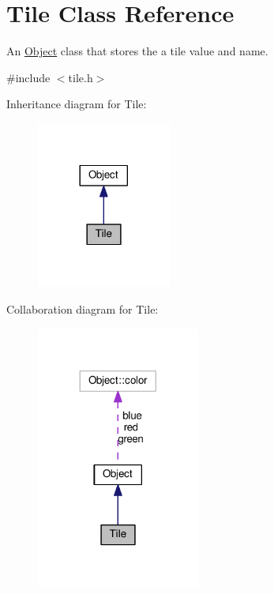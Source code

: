 \hypertarget{classTile}{}\section{Tile Class Reference}
\label{classTile}


An \hyperlink{classObject}{Object} class that stores the a tile value and name.  




{\ttfamily \#include $<$tile.\+h$>$}



Inheritance diagram for Tile\+:\nopagebreak
\begin{figure}[H]
\begin{center}
\leavevmode
\includegraphics[width=125pt]{classTile__inherit__graph}
\end{center}
\end{figure}


Collaboration diagram for Tile\+:
\nopagebreak
\begin{figure}[H]
\begin{center}
\leavevmode
\includegraphics[width=152pt]{classTile__coll__graph}
\end{center}
\end{figure}
